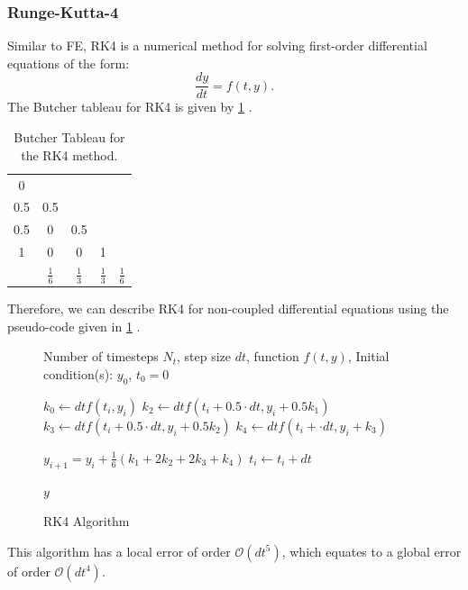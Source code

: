 \subsubsection{Runge-Kutta-4}
Similar to FE, RK4 is a numerical method for solving first-order differential equations of the form:
\begin{equation*}
    \frac{dy}{dt} = f(t,y).
\end{equation*}
The Butcher tableau for RK4 is given by \cref{tab:RK4-Butcher} \cite{Faul2016ACI}.
\begin{table}[h]
    \centering
    \caption{Butcher Tableau for the RK4 method.}
    \begin{tabular}{c|cccc}
        0 & \\
        0.5 & 0.5\\
        0.5 & 0 & 0.5\\
        1 & 0 & 0 & 1 \\
        \hline
         & $\frac{1}{6}$ & $\frac{1}{3}$ & $\frac{1}{3}$ & $\frac{1}{6}$
    \end{tabular}
    \label{tab:RK4-Butcher}
\end{table}
Therefore, we can describe RK4 for non-coupled differential equations using the pseudo-code given in \cref{algo:RK4} \cite{LectureNotes}. 
\begin{figure}[H]
    \begin{algorithm}[H]\label{algo:RK4}
        \caption{RK4 Algorithm}
        \label{algo:RK4}

        \begin{algorithmic}[1]
           \Require Number of timesteps $N_t$,
                    step size $dt$,
                    function $f(t,y)$,
                    Initial condition(s): $y_0$, $t_0=0$


            \State $k_0 \gets dt f(t_i, y_i)$
            \State $k_2 \gets dt f(t_i+ 0.5 \cdot dt, y_i+ 0.5 k_1)$
            \State $k_3 \gets dt f(t_i+ 0.5 \cdot dt, y_i+ 0.5 k_2)$
            \State $k_4 \gets dt f(t_i + \cdot dt, y_i+ k_3)$

            \State $y_{i+1} = y_i + \frac{1}{6}(k_1 + 2k_2 + 2k_3 + k_4)$
            \State $t_i \gets t_i + dt$
         \EndFor

        \State \Return $y$
        \end{algorithmic}
    \end{algorithm}
\end{figure}
This algorithm has a local error of order $\mathcal{O}(dt^5)$, which equates to a global error of order $\mathcal{O}(dt^4)$.
